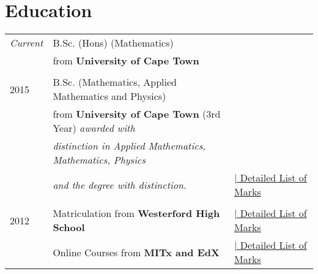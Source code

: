 
\section{Education}

\begin{tabular}{R{3cm}|ll}
  \emph{Current}& B.Sc. (Hons) (Mathematics)&\\ &\hspace{20pt}from \textbf{University of Cape Town} &\\
                &&\\
  2015& B.Sc. (Mathematics, Applied Mathematics and Physics)&\\ 
      &\hspace{20pt}from \textbf{University of Cape Town} (3rd Year) \emph{awarded with}&\\
      &\hspace{20pt}\emph{distinction in Applied Mathematics, Mathematics, Physics}&\\
      &\hspace{20pt}\emph{and the degree with distinction. }&\hyperlink{unigrds}{\hfill | \footnotesize Detailed List of Marks}\\
&&\\
  2012 & Matriculation from \textbf{Westerford High School}&\hyperlink{matgrds}{\hfill | \footnotesize Detailed List of Marks}\\
& Online Courses from \textbf{MITx and EdX} &\hyperlink{ongrds}{\hfill | \footnotesize Detailed List of Marks}\\
\end{tabular}

